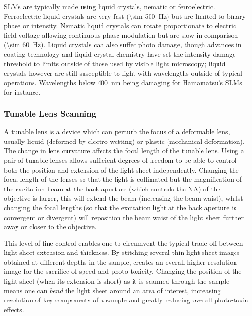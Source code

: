 SLMs are typically made using liquid crystals, nematic or ferroelectric.
Ferroelectric liquid crystals are very fast (\SI{\sim 500}{\hertz}\cite{Meadowlark2015}) but are limited to binary phase or intensity.
Nematic liquid crystals can rotate proportionate to electric field voltage allowing continuous phase modulation but are slow in comparison (\SI{\sim 60}{\hertz}\cite{Hamamatsu2015}).
Liquid crystals can also suffer photo damage, though advances in coating technology and liquid crystal chemistry have set the intensity damage threshold to limits outside of those used by visible light microscopy; liquid crystals however are still susceptible to light with wavelengths outside of typical operations.
Wavelengths below \SI{400}{\nano\meter} being damaging for Hamamatsu's SLMs for instance\cite{Hamamatsu2015}.

\subsubsection{Tunable Lens Scanning}\label{sec:tunable}

A tunable lens is a device which can perturb the focus of a deformable lens, usually liquid (deformed by electro-wetting) or plastic (mechanical deformation).
The change in lens curvature affects the focal length of the tunable lens.
Using a pair of tunable lenses allows sufficient degrees of freedom to be able to control both the position and extension of the light sheet independently.
Changing the focal length of the lenses so that the light is collimated but the magnification of the excitation beam at the back aperture (which controls the NA) of the objective is larger, this will extend the beam (increasing the beam waist), whilst changing the focal lengths (so that the excitation light at the back aperture is convergent or divergent) will reposition the beam waist of the light sheet further away or closer to the objective\cite{Chmielewski2015}.

This level of fine control enables one to circumvent the typical trade off between light sheet extension and thickness.
By stitching several thin light sheet images obtained at different depths in the sample, creates an overall higher resolution image for the sacrifice of speed and photo-toxicity.
Changing the position of the light sheet (when its extension is short) as it is scanned through the sample means one can \textit{bend} the light sheet around an area of interest, increasing resolution of key components of a sample and greatly reducing overall photo-toxic effects.

